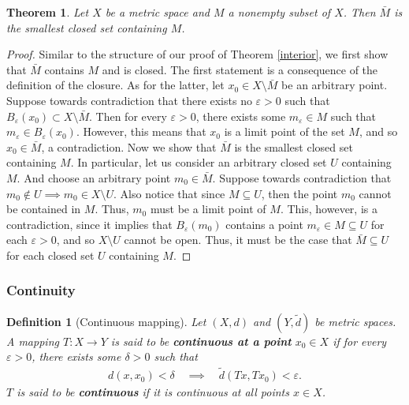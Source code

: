 \documentclass[11pt]{article}
\theoremstyle{mystyle}
\newtheorem{thm}{Theorem}[section]
\newtheorem{defn}{Definition}[section]
\newcommand{\0}{\mathbf{0}}
\begin{document}
\begin{thm}
Let $X$ be a metric space and $M$ a nonempty subset of $X$. Then $\bar{M}$ is the smallest closed set containing $M$.
\end{thm}
\begin{proof}
Similar to the structure of our proof of Theorem \ref{interior}, we first show that $\bar{M}$ contains $M$ and is closed. The first statement is a consequence of the definition of the closure. As for the latter, let $x_0 \in X \setminus \bar{M}$ be an arbitrary point. Suppose towards contradiction that there exists no $\varepsilon > 0$ such that $B_{\varepsilon}(x_0) \subset X \setminus \bar{M}$. Then for every $\varepsilon > 0$, there exists some $m_{\varepsilon} \in M$ such that $m_{\varepsilon} \in B_{\varepsilon}(x_0)$. However, this means that $x_0$ is a limit point of the set $M$, and so $x_0 \in \bar{M}$, a contradiction.\newline
Now we show that $\bar{M}$ is the smallest closed set containing $M$. In particular, let us consider an arbitrary closed set $U$ containing $M$. And choose an arbitrary point $m_0 \in \bar{M}$. Suppose towards contradiction that $m_0 \notin U \implies m_0 \in X \setminus U$. Also notice that since $M \subseteq U$, then the point $m_0$ cannot be contained in $M$. Thus, $m_0$ must be a limit point of $M$. This, however, is a contradiction, since it implies that $B_{\varepsilon}(m_0)$ contains a point $m_{\varepsilon} \in M \subseteq U$ for each $\varepsilon > 0$, and so $X \setminus U$ cannot be open. Thus, it must be the case that $\bar{M} \subseteq U$ for each closed set $U$ containing $M$.
\end{proof}

\subsubsection{Continuity}

\begin{defn}[Continuous mapping]
Let $(X, d)$ and $(Y, \tilde{d})$ be metric spaces. A mapping $T: X \longrightarrow Y$ is said to be \textbf{continuous at a point} $x_0 \in X$ if for every $\varepsilon > 0$, there exists some $\delta > 0$ such that
\begin{align*}
    d(x, x_0) < \delta \quad \implies \quad \tilde{d}(Tx, Tx_0) < \varepsilon.
\end{align*}
$T$ is said to be \textbf{continuous} if it is continuous at all points $x \in X$.
\end{defn}
\end{document}
